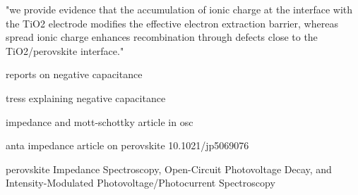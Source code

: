 "we provide evidence that the accumulation of ionic charge at the interface with the TiO2 electrode modifies the effective electron extraction barrier, whereas spread ionic charge enhances recombination through defects close to the TiO2/perovskite interface." \cite{Tress2016}

reports on negative capacitance \cite{Sanchez2014}

tress explaining negative capacitance \cite{Ebadi2019}

impedance and mott-schottky article in osc \cite{Brus2016}

anta impedance article on perovskite 10.1021/jp5069076

perovskite Impedance Spectroscopy, Open-Circuit Photovoltage Decay, and Intensity-Modulated Photovoltage/Photocurrent Spectroscopy \cite{Pockett2015}